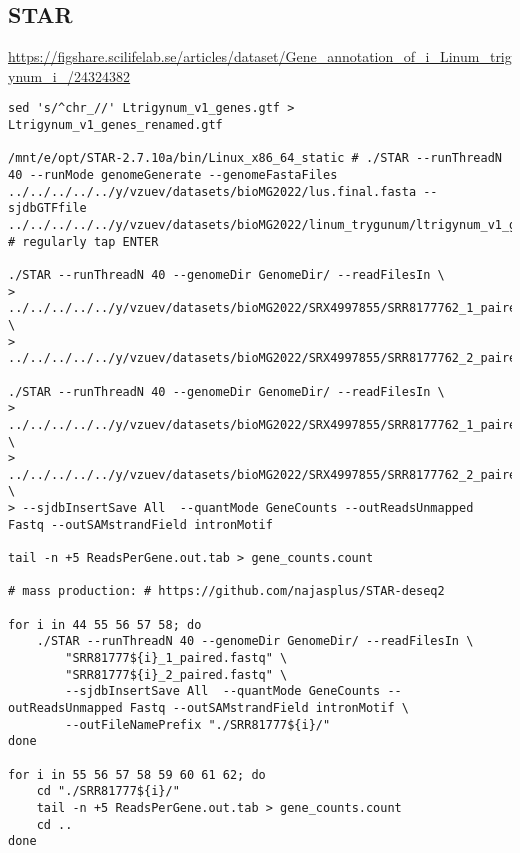 \subsection{STAR}

\url{https://figshare.scilifelab.se/articles/dataset/Gene_annotation_of_i_Linum_trigynum_i_/24324382}

\begin{verbatim}
sed 's/^chr_//' Ltrigynum_v1_genes.gtf > Ltrigynum_v1_genes_renamed.gtf

/mnt/e/opt/STAR-2.7.10a/bin/Linux_x86_64_static # ./STAR --runThreadN 40 --runMode genomeGenerate --genomeFastaFiles ../../../../../y/vzuev/datasets/bioMG2022/lus.final.fasta --sjdbGTFfile ../../../../../y/vzuev/datasets/bioMG2022/linum_trygunum/ltrigynum_v1_genes.gtf # regularly tap ENTER

./STAR --runThreadN 40 --genomeDir GenomeDir/ --readFilesIn \
> ../../../../../y/vzuev/datasets/bioMG2022/SRX4997855/SRR8177762_1_paired.fastq \
> ../../../../../y/vzuev/datasets/bioMG2022/SRX4997855/SRR8177762_2_paired.fastq

./STAR --runThreadN 40 --genomeDir GenomeDir/ --readFilesIn \
> ../../../../../y/vzuev/datasets/bioMG2022/SRX4997855/SRR8177762_1_paired.fastq \
> ../../../../../y/vzuev/datasets/bioMG2022/SRX4997855/SRR8177762_2_paired.fastq \
> --sjdbInsertSave All  --quantMode GeneCounts --outReadsUnmapped Fastq --outSAMstrandField intronMotif

tail -n +5 ReadsPerGene.out.tab > gene_counts.count

# mass production: # https://github.com/najasplus/STAR-deseq2

for i in 44 55 56 57 58; do
    ./STAR --runThreadN 40 --genomeDir GenomeDir/ --readFilesIn \
        "SRR81777${i}_1_paired.fastq" \
        "SRR81777${i}_2_paired.fastq" \
        --sjdbInsertSave All  --quantMode GeneCounts --outReadsUnmapped Fastq --outSAMstrandField intronMotif \
        --outFileNamePrefix "./SRR81777${i}/"
done

for i in 55 56 57 58 59 60 61 62; do
    cd "./SRR81777${i}/"
    tail -n +5 ReadsPerGene.out.tab > gene_counts.count
    cd ..
done

\end{verbatim}

